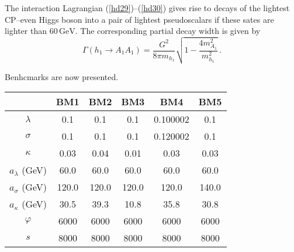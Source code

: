 \documentclass[12pt,a4paper]{article}
\begin{document}
The interaction Lagrangian (\ref{hd29})--(\ref{hd30}) gives rise to decays of the lightest CP--even Higgs boson into
a pair of lightest pseudoscalars if these sates are lighter than $60\,\mbox{GeV}$. The corresponding partial decay width is given by
\begin{equation}
\Gamma(h_1\to A_1 A_1)=\dfrac{G^2}{8\pi m_{h_1}}\sqrt{1-\dfrac{4 m_{A_1}^2}{m_{h_1}^2}}\,.
\label{31}
\end{equation}

Benhcmarks are now presented.

\noindent \begin{tabular}{| c || c | c |c| c| c|}
\hline
                            &            BM1                   &       BM2             &         BM3             &       BM4              &       BM5       \\   
\hline                                                                                                                                       
$\lambda$                    & 	      0.1                     &	       0.1              & 	0.1                  & 	0.100002           & 	0.1                                   \\    
$\sigma$                    & 	       0.1                   &        0.1               & 	0.1                  & 	0.120002           & 	0.1                                   \\    
$\kappa$                    & 	       0.03                   &        0.04             & 	0.01                 & 	0.03               & 	0.03                                  \\    
$a_{\lambda}$ (GeV) 	  & 	       60.0                  & 	     60.0        	 & 	60.0                 & 	60.0              & 	60.0                               \\    
$a_{\sigma}$ (GeV) 	 & 	       120.0                &        120.0            & 	120.0              & 	120.0             & 	140.0                            \\    
$a_{\kappa}$ (GeV) 	 & 	        30.5                 &	       39.3               & 	10.8                 &   35.8               &  	30.8                       \\    
$\varphi$                    &     	6000                  &	       6000             & 	6000                 & 	6000               & 	6000                                  \\    
$s$                   	      &      	8000                 & 	       8000            & 	8000                 & 	8000            & 	8000                                  \\    

\end{tabular}
\end{document}
